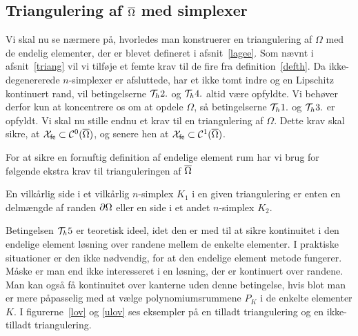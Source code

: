 \subsection{Triangulering af $\overline{\Omega}$ med simplexer}
Vi skal nu se nærmere på, hvorledes man konstruerer en 
triangulering af $\Omega$ med de endelig elementer, der er blevet defineret
i afsnit~\ref{lagee}. Som nævnt i afsnit~\ref{triang} vil vi tilføje
et femte krav til de fire fra definition~\ref{defth}.
Da ikke-degenererede $n$-simplexer er afsluttede, har et ikke tomt indre og en 
Lipschitz kontinuert rand, vil betingelserne ${\cal{T}}_h 2.$ og ${\cal{T}}_h 4.$ 
altid være opfyldte. Vi behøver derfor kun at koncentrere os om at 
opdele $\Omega$, så betingelserne ${\cal{T}}_h 1.$ og ${\cal{T}}_h 3.$ er opfyldt. Vi skal
nu stille endnu et krav til en triangulering af $\Omega$. Dette krav
skal sikre, at ${\mathcal{X}}_{\mathsf{fe}} \subset {\cal{C}}^0(\overline{\Omega})$, og senere
hen at ${\mathcal{X}}_{\mathsf{fe}} \subset {\cal{C}}^1(\overline{\Omega})$.
\begin{definition} \label{th5}
For at sikre en fornuftig definition af endelige element rum har vi brug 
for følgende ekstra krav til trianguleringen af $\overline{\Omega}$
\begin{Thenumerate}
 \setcounter{enumi}{4}
 \item En vilkårlig side i et vilkårlig $n$-simplex $K_1$ i en given
       triangulering er enten en delmængde af randen $\partial\Omega$ eller en 
       side i et andet $n$-simplex $K_2$.
\end{Thenumerate}
\end{definition}
\begin{remark}
Betingelsen ${\cal{T}}_h 5$ er teoretisk ideel, idet den er med til at sikre
kontinuitet i den endelige element løsning over randene mellem de
enkelte elementer. I praktiske
situationer er den ikke nødvendig, for at den endelige element metode
fungerer. Måske er man end ikke interesseret i en løsning, der er
kontinuert over randene. 
Man kan også få kontinuitet over kanterne uden denne
betingelse, hvis blot man er mere påpasselig med at vælge
polynomiumsrummene $P_K$ i de enkelte elementer $K$. I
figurerne~\ref{lov} og \ref{ulov} ses eksempler
på en tilladt triangulering og en ikke-tilladt triangulering.
\end{remark}
